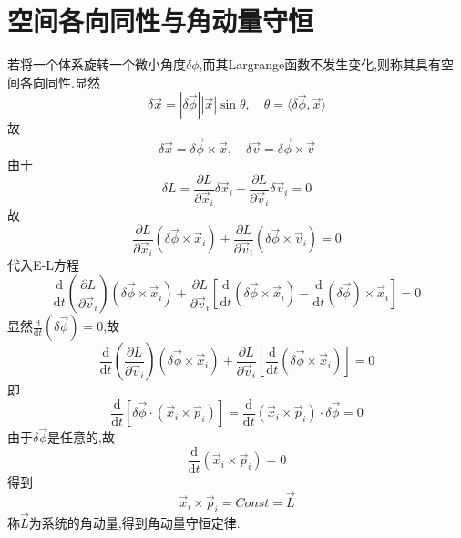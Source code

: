 \section{空间各向同性与角动量守恒}
若将一个体系旋转一个微小角度$\delta\phi$,而其Largrange函数不发生变化,则称其具有空间各向同性.显然
\begin{equation}
\delta\vec{x} = |\delta\vec{\phi}| |\vec{x}|\sin\theta,\quad 
\theta = \langle \delta\vec{\phi},\vec{x} \rangle
\end{equation}
故
\begin{equation}
\delta\vec{x} = \delta\vec{\phi} \times \vec{x},\quad 
\delta\vec{v} = \delta\vec{\phi} \times \vec{v}
\end{equation}
由于
\begin{equation}
\delta L = \frac{\partial L}{\partial\vec{x}_i}\delta\vec{x}_i + 
\frac{\partial L}{\partial\vec{v}_i}\delta\vec{v}_i = 0
\end{equation}
故
\begin{equation}
\frac{\partial L}{\partial\vec{x}_i}(\delta\vec{\phi} \times \vec{x}_i) + 
\frac{\partial L}{\partial\vec{v}_i}(\delta\vec{\phi} \times \vec{v}_i) = 0
\end{equation}
代入E-L方程
\begin{equation}
\frac{\mathrm{d}}{\mathrm{d}t} \left(\frac{\partial L}{\partial\vec{v}_i}\right)(\delta\vec{\phi} \times \vec{x}_i) + 
\frac{\partial L}{\partial\vec{v}_i}
\left[ 
\frac{\mathrm{d}}{\mathrm{d}t}(\delta\vec{\phi} \times \vec{x}_i) - 
\frac{\mathrm{d}}{\mathrm{d}t}(\delta\vec{\phi}) \times \vec{x}_i
\right] = 0
\end{equation}
显然$\frac{\mathrm{d}}{\mathrm{d}t}(\delta\vec{\phi})=0$,故
\begin{equation}
\frac{\mathrm{d}}{\mathrm{d}t} \left(\frac{\partial L}{\partial\vec{v}_i}\right)(\delta\vec{\phi} \times \vec{x}_i) + 
\frac{\partial L}{\partial\vec{v}_i}
\left[ 
\frac{\mathrm{d}}{\mathrm{d}t}(\delta\vec{\phi} \times \vec{x}_i)
\right] = 0
\end{equation}
即
\begin{equation}
\frac{\mathrm{d}}{\mathrm{d}t} [\delta\vec{\phi}\cdot(\vec{x}_i \times \vec{p}_i)] = 
\frac{\mathrm{d}}{\mathrm{d}t} (\vec{x}_i \times \vec{p}_i)\cdot\delta\vec{\phi} = 0
\end{equation}
由于$\delta\vec{\phi}$是任意的,故
\begin{equation}
\frac{\mathrm{d}}{\mathrm{d}t} (\vec{x}_i \times \vec{p}_i) = 0
\end{equation}
得到
\begin{equation}
\vec{x}_i \times \vec{p}_i = Const = \vec{L}
\end{equation}
称$\vec{L}$为系统的角动量,得到角动量守恒定律.

